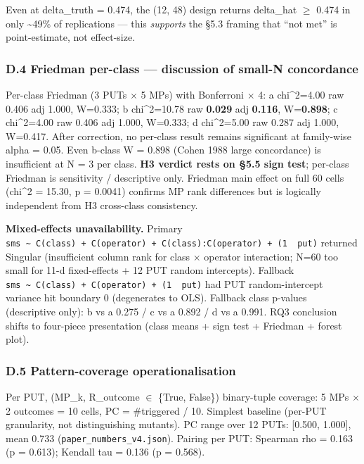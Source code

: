 \documentclass[review,12pt,authoryear]{elsarticle}
\begin{document}
Even at delta\_truth = 0.474, the (12, 48) design returns delta\_hat $\geq$
0.474 in only \textasciitilde49\% of replications --- this
\emph{supports} the §5.3 framing that ``not met'' is point-estimate, not
effect-size.

\subsubsection{D.4 Friedman per-class --- discussion of small-N concordance}\label{d.4-friedman-per-class-discussion-of-small-n-concordance}

Per-class Friedman (3 PUTs $\times$ 5 MPs) with Bonferroni $\times$ 4: a chi\^{}2=4.00
raw 0.406 adj 1.000, W=0.333; b chi\^{}2=10.78 raw \textbf{0.029} adj
\textbf{0.116}, W=\textbf{0.898}; c chi\^{}2=4.00 raw 0.406 adj 1.000,
W=0.333; d chi\^{}2=5.00 raw 0.287 adj 1.000, W=0.417. After correction,
no per-class result remains significant at family-wise alpha = 0.05.
Even b-class W = 0.898 (Cohen 1988 large concordance) is insufficient at
N = 3 per class. \textbf{H3 verdict rests on §5.5 sign test}; per-class
Friedman is sensitivity / descriptive only. Friedman main effect on full
60 cells (chi\^{}2 = 15.30, p = 0.0041) confirms MP rank differences but
is logically independent from H3 cross-class consistency.

\textbf{Mixed-effects unavailability.} Primary
\texttt{sms\ \textasciitilde{}\ C(class)\ +\ C(operator)\ +\ C(class):C(operator)\ +\ (1\ \textbar{}\ put)}
returned Singular (insufficient column rank for class $\times$ operator
interaction; N=60 too small for 11-d fixed-effects + 12 PUT random
intercepts). Fallback
\texttt{sms\ \textasciitilde{}\ C(class)\ +\ C(operator)\ +\ (1\ \textbar{}\ put)}
had PUT random-intercept variance hit boundary 0 (degenerates to OLS).
Fallback class p-values (descriptive only): b vs a 0.275 / c vs a 0.892
/ d vs a 0.991. RQ3 conclusion shifts to four-piece presentation (class
means + sign test + Friedman + forest plot).

\subsubsection{D.5 Pattern-coverage operationalisation}\label{d.5-pattern-coverage-operationalisation}

Per PUT, (MP\_k, R\_outcome $\in$ \{True, False\}) binary-tuple coverage: 5
MPs $\times$ 2 outcomes = 10 cells, PC = \#triggered / 10. Simplest baseline
(per-PUT granularity, not distinguishing mutants). PC range over 12
PUTs: {[}0.500, 1.000{]}, mean 0.733 (\texttt{paper\_numbers\_v4.json}).
Pairing per PUT: Spearman rho = 0.163 (p = 0.613); Kendall tau = 0.136
(p = 0.568).
\end{document}
